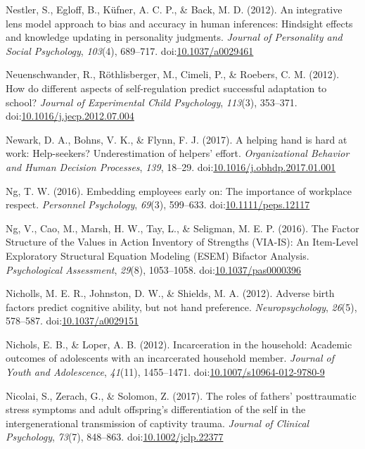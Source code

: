 \documentclass[english,man]{apa6}
\begin{document}
\hypertarget{ref-Nestler}{}
Nestler, S., Egloff, B., Küfner, A. C. P., \& Back, M. D. (2012). An
integrative lens model approach to bias and accuracy in human
inferences: Hindsight effects and knowledge updating in personality
judgments. \emph{Journal of Personality and Social Psychology},
\emph{103}(4), 689--717.
doi:\href{https://doi.org/10.1037/a0029461}{10.1037/a0029461}

\hypertarget{ref-Neuenschwander2012}{}
Neuenschwander, R., Röthlisberger, M., Cimeli, P., \& Roebers, C. M.
(2012). How do different aspects of self-regulation predict successful
adaptation to school? \emph{Journal of Experimental Child Psychology},
\emph{113}(3), 353--371.
doi:\href{https://doi.org/10.1016/j.jecp.2012.07.004}{10.1016/j.jecp.2012.07.004}

\hypertarget{ref-Newark2017}{}
Newark, D. A., Bohns, V. K., \& Flynn, F. J. (2017). A helping hand is
hard at work: Help-seekers? Underestimation of helpers' effort.
\emph{Organizational Behavior and Human Decision Processes}, \emph{139},
18--29.
doi:\href{https://doi.org/10.1016/j.obhdp.2017.01.001}{10.1016/j.obhdp.2017.01.001}

\hypertarget{ref-Ng2016}{}
Ng, T. W. (2016). Embedding employees early on: The importance of
workplace respect. \emph{Personnel Psychology}, \emph{69}(3), 599--633.
doi:\href{https://doi.org/10.1111/peps.12117}{10.1111/peps.12117}

\hypertarget{ref-Ng2017}{}
Ng, V., Cao, M., Marsh, H. W., Tay, L., \& Seligman, M. E. P. (2016).
The Factor Structure of the Values in Action Inventory of Strengths
(VIA-IS): An Item-Level Exploratory Structural Equation Modeling (ESEM)
Bifactor Analysis. \emph{Psychological Assessment}, \emph{29}(8),
1053--1058.
doi:\href{https://doi.org/10.1037/pas0000396}{10.1037/pas0000396}

\hypertarget{ref-Nicholls2012}{}
Nicholls, M. E. R., Johnston, D. W., \& Shields, M. A. (2012). Adverse
birth factors predict cognitive ability, but not hand preference.
\emph{Neuropsychology}, \emph{26}(5), 578--587.
doi:\href{https://doi.org/10.1037/a0029151}{10.1037/a0029151}

\hypertarget{ref-Nichols2012}{}
Nichols, E. B., \& Loper, A. B. (2012). Incarceration in the household:
Academic outcomes of adolescents with an incarcerated household member.
\emph{Journal of Youth and Adolescence}, \emph{41}(11), 1455--1471.
doi:\href{https://doi.org/10.1007/s10964-012-9780-9}{10.1007/s10964-012-9780-9}

\hypertarget{ref-Nicolai2017}{}
Nicolai, S., Zerach, G., \& Solomon, Z. (2017). The roles of fathers'
posttraumatic stress symptoms and adult offspring's differentiation of
the self in the intergenerational transmission of captivity trauma.
\emph{Journal of Clinical Psychology}, \emph{73}(7), 848--863.
doi:\href{https://doi.org/10.1002/jclp.22377}{10.1002/jclp.22377}
\end{document}
